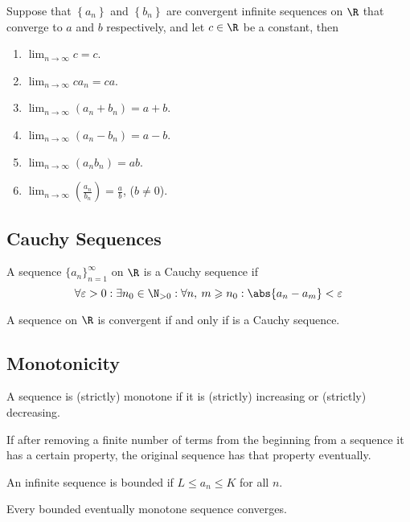 \documentclass{article}
\begin{document}
\begin{tcolorboxlarge}[title={Limit Laws for Sequences}]
    \begin{theorem}
        Suppose that $\left\{a_n\right\}$ and $\left\{b_n\right\}$ are convergent infinite sequences on $\R$ that converge to $a$ and $b$ respectively, and let $c\in\R$ be a constant, then
        \begin{enumerate}[label=\normalfont\alph*)]
            \item $\lim_{n\to\infty}c=c$.
            \item $\lim_{n\to\infty}ca_n=ca$.
            \item $\lim_{n\to\infty}\left( a_n + b_n \right)=a+b$.
            \item $\lim_{n\to\infty}\left( a_n - b_n \right)=a-b$.
            \item $\lim_{n\to\infty}\left( a_nb_n \right)=ab$.
            \item $\lim_{n\to\infty}\left( \frac{a_n}{b_n} \right)=\frac{a}{b}$, ($b\neq 0$).
        \end{enumerate}
    \end{theorem}
\end{tcolorboxlarge}
%
\subsection{Cauchy Sequences}
\begin{definition}
    A sequence $\{a_n\}_{n=1}^\infty$ on $\R$ is a Cauchy sequence if
    \begin{equation*}
        \forall \varepsilon > 0:\exists n_0\in\N_{>0}:\forall n,\: m \geqslant n_0:\abs{a_n-a_m}<\varepsilon
    \end{equation*}
\end{definition}
\begin{theorem}
    A sequence on $\R$ is convergent if and only if is a Cauchy sequence.
\end{theorem}
\subsection{Monotonicity}
%
\begin{definition}[Monotone]
    A sequence is (strictly) monotone if it is
    (strictly) increasing or (strictly) decreasing.
\end{definition}
%
\begin{definition}[Eventually]
    If after removing a finite number of terms from the beginning from a sequence
    it has a certain property, the original sequence has that property eventually.
\end{definition}
%
\begin{definition}[Bounded]
    An infinite sequence is bounded if $L \leqslant a_n \leqslant K$ for all $n$.
\end{definition}
%
\begin{theorem}
    Every bounded eventually monotone sequence converges.
\end{theorem}
%
\end{document}

